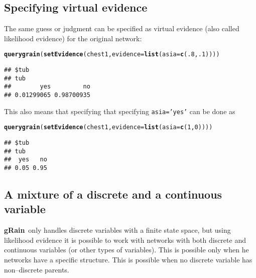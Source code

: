 \documentclass[10pt]{article}\usepackage[]{graphicx}\usepackage[]{color}
\makeatletter
\newcommand{\hlnum}[1]{\textcolor[rgb]{0.686,0.059,0.569}{#1}}%
\newcommand{\hlstd}[1]{\textcolor[rgb]{0.345,0.345,0.345}{#1}}%
\newcommand{\hlkwc}[1]{\textcolor[rgb]{0.333,0.667,0.333}{#1}}%
\newcommand{\hlkwd}[1]{\textcolor[rgb]{0.737,0.353,0.396}{\textbf{#1}}}%
\newenvironment{kframe}{%
 \def\at@end@of@kframe{}%
 \ifinner\ifhmode%
  \def\at@end@of@kframe{\end{minipage}}%
  \begin{minipage}{\columnwidth}%
 \fi\fi%
 \def\FrameCommand##1{\hskip\@totalleftmargin \hskip-\fboxsep
 \colorbox{shadecolor}{##1}\hskip-\fboxsep
     \hskip-\linewidth \hskip-\@totalleftmargin \hskip\columnwidth}%
 \MakeFramed {\advance\hsize-\width
   \@totalleftmargin\z@ \linewidth\hsize
   \@setminipage}}%
 {\par\unskip\endMakeFramed%
 \at@end@of@kframe}
\newenvironment{knitrout}{}{} %
\def\grbn{{\bf gRain}}
\def\code#1{{\texttt{#1}}}
\makeatother
\begin{document}
\subsection{Specifying virtual evidence}
\label{sec:spec-virt-evid}

The same guess or judgment can be specified as virtual evidence
(also called likelihood evidence) for the original network:

\begin{knitrout}
\color{fgcolor}\begin{kframe}
\begin{alltt}
\hlkwd{querygrain}\hlstd{(}\hlkwd{setEvidence}\hlstd{(chest1,} \hlkwc{evidence}\hlstd{=}\hlkwd{list}\hlstd{(}\hlkwc{asia}\hlstd{=}\hlkwd{c}\hlstd{(}\hlnum{.8}\hlstd{,} \hlnum{.1}\hlstd{))))}
\end{alltt}
\begin{verbatim}
## $tub
## tub
##        yes         no 
## 0.01299065 0.98700935
\end{verbatim}
\end{kframe}
\end{knitrout}

This also means that specifying that specifying \code{asia='yes'} can
be done as
\begin{knitrout}
\color{fgcolor}\begin{kframe}
\begin{alltt}
\hlkwd{querygrain}\hlstd{(}\hlkwd{setEvidence}\hlstd{(chest1,} \hlkwc{evidence}\hlstd{=}\hlkwd{list}\hlstd{(}\hlkwc{asia}\hlstd{=}\hlkwd{c}\hlstd{(}\hlnum{1}\hlstd{,} \hlnum{0}\hlstd{))))}
\end{alltt}
\begin{verbatim}
## $tub
## tub
##  yes   no 
## 0.05 0.95
\end{verbatim}
\end{kframe}
\end{knitrout}


\subsection{A mixture of a discrete and a continuous variable}
\label{sec:ixture}

\grbn\ only handles discrete variables with a finite state space, but
using likelihood evidence it is possible to work with networks with
both discrete and continuous variables (or other types of variables).
This is possible only when he networks
have a specific structure. This is possible when no discrete variable
has non--discrete parents.
\end{document}
